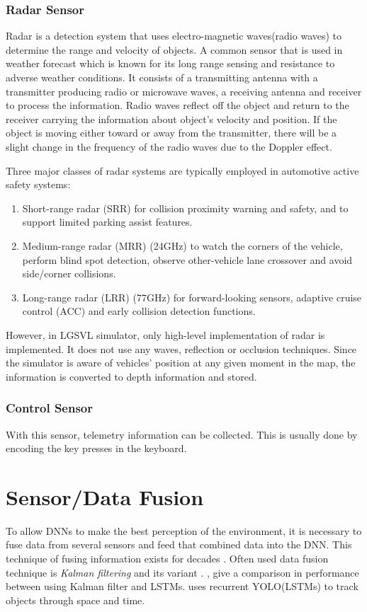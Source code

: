 \subsubsection*{Radar Sensor}
Radar is a detection system that uses electro-magnetic waves(radio waves) to determine the
range and velocity of objects. A common sensor that is used in weather forecast which is known for its
long range sensing and resistance to adverse weather conditions. It consists of a transmitting antenna with a
transmitter producing radio or microwave waves, a receiving antenna and receiver to
process the information. Radio waves reflect off the object and return to the receiver
carrying the information about object's velocity and position.
If the object is moving either toward or away from the transmitter, there will be a slight change in the frequency of the radio waves due to the Doppler effect.

Three major classes of radar systems are typically employed in automotive active safety systems:
\begin{enumerate}
    \item Short-range radar (SRR) for collision proximity warning and safety, and to support limited parking assist features.
    \item Medium-range radar (MRR) (24GHz) to watch the corners of the vehicle, perform blind spot detection, observe other-vehicle lane crossover and avoid side/corner collisions.
    \item Long-range radar (LRR) (77GHz) for forward-looking sensors, adaptive cruise control (ACC) and early collision detection functions.
\end{enumerate}

However, in LGSVL simulator, only high-level implementation of radar is implemented. It
does not use any waves, reflection or occlusion techniques. Since the simulator is aware
of vehicles' position at any given moment in the map, the information is converted to
depth information and stored.

\subsubsection*{Control Sensor}
With this sensor, telemetry information can be collected. This is usually done by
encoding the key presses in the keyboard.

\section{Sensor/Data Fusion}
To allow DNNs to make the best perception of the environment, it is necessary to fuse data from
several sensors and feed that combined data into the DNN. This technique of fusing
information exists for decades \cite{Datafusion1}. Often used data fusion technique is
\textit{Kalman filtering} and its variant \cite{Datafusion3} \cite{Datafusion2}. \cite{kalmanfilterpaper1},
\cite{kalmanfilterpaper2} give a comparison in performance between using Kalman filter and
LSTMs. \cite{kalmanfilterpaper3} uses recurrent YOLO(LSTMs) to track objects through space and time.


